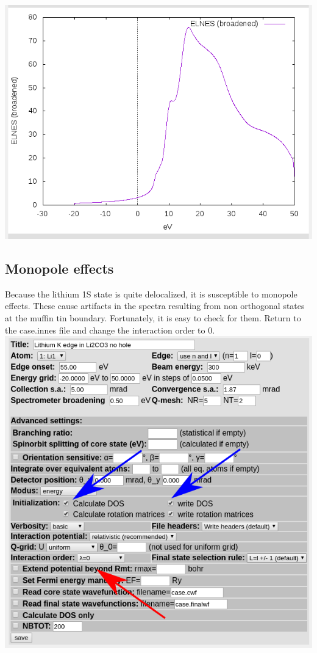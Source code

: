 \documentclass[12pt]{article}
\begin{document}
\includegraphics[scale=0.4]{./images/no_hole_elnes.png}

\subsection{Monopole effects}
Because the lithium 1S state is quite delocalized, it is susceptible to monopole effects.  These cause artifacts in the spectra resulting from non orthogonal states at the muffin tin boundary.  Fortunately, it is easy to check for them.  Return to the case.innes file and change the interaction order to 0. \\


\includegraphics[scale=0.5]{./images/innes_monopole.png}
\end{document}
